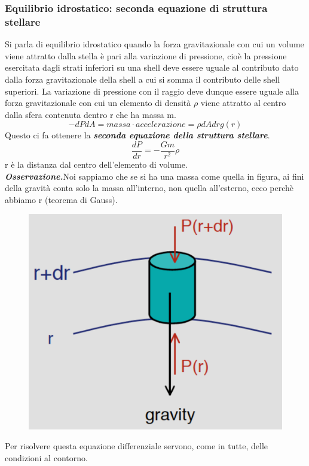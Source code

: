 \documentclass[a4paper,11pt]{article}
\begin{document}
\subsubsection{Equilibrio idrostatico: seconda equazione di struttura stellare}
Si parla di equilibrio idrostatico quando la forza gravitazionale con cui un volume viene attratto dalla stella è pari alla variazione di pressione, cioè la pressione esercitata dagli strati inferiori su una shell deve essere uguale al contributo dato dalla forza gravitazionale della shell a cui si somma il contributo delle shell superiori. La variazione di pressione con il raggio deve dunque essere uguale alla forza gravitazionale con cui un elemento di densità $\rho$ viene attratto al centro dalla sfera contenuta dentro r che ha massa m. 
$$-dPdA=massa\cdot accelerazione=\rho dAdr g(r)$$
Questo ci fa ottenere la \textbf{\textit{seconda equazione della struttura stellare}}.
\begin{equation}
    \frac{dP}{dr}=-\frac{Gm}{r^2}\rho
    \label{struttura2}
\end{equation}
r è la distanza dal centro dell'elemento di volume.\\
\textbf{\textit{Osservazione.}}Noi sappiamo che se si ha una massa come quella in figura, ai fini della gravità conta solo la massa all'interno, non quella all'esterno, ecco perchè abbiamo r (teorema di Gauss).
\begin{figure}[h!]
    \centering
    \includegraphics[scale=0.5]{eqidr.png}
\end{figure}
Per risolvere questa equazione differenziale servono, come in tutte, delle condizioni al contorno.\\
\end{document}
